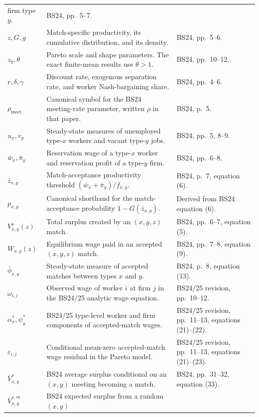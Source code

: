 \documentclass[11pt]{article}
\begin{document}
\begin{longtable}{p{}p{}p{}}
firm type \(y\). & BS24, pp.\ 5--7. \\
\(z,G,g\) & Match-specific productivity, its cumulative distribution, and
its density. & BS24, pp.\ 5--6. \\
\(z_0,\theta\) & Pareto scale and shape parameters.  The exact finite-mean
results use \(\theta>1\). & BS24, pp.\ 10--12. \\
\(r,\delta,\gamma\) & Discount rate, exogenous separation rate, and worker
Nash-bargaining share. & BS24, pp.\ 4--6. \\
\(\rho_{\mathrm{meet}}\) & Canonical symbol for the BS24 meeting-rate
parameter, written \(\rho\) in that paper. & BS24, p.\ 5. \\
\(u_x,v_y\) & Steady-state measures of unemployed type-\(x\) workers and
vacant type-\(y\) jobs. & BS24, pp.\ 5, 8--9. \\
\(\bar w_x,\bar\pi_y\) & Reservation wage of a type-\(x\) worker and
reservation profit of a type-\(y\) firm. & BS24, pp.\ 6--8. \\
\(\bar z_{x,y}\) & Match-acceptance productivity threshold
\((\bar w_x+\bar\pi_y)/f_{x,y}\). & BS24, p.\ 7, equation (6). \\
\(p_{x,y}\) & Canonical shorthand for the match-acceptance probability
\(1-G(\bar z_{x,y})\). & Derived from BS24 equation (6). \\
\(V^s_{x,y}(z)\) & Total surplus created by an \((x,y,z)\) match. & BS24,
pp.\ 6--7, equation (5). \\
\(W_{x,y}(z)\) & Equilibrium wage paid in an accepted
\((x,y,z)\) match. & BS24, pp.\ 7--8, equation (9). \\
\(\bar\phi_{x,y}\) & Steady-state measure of accepted matches between types
\(x\) and \(y\). & BS24, p.\ 8, equation (13). \\
\(\omega_{i,j}\) & Observed wage of worker \(i\) at firm \(j\) in the BS24/25
analytic wage equation. & BS24/25 revision, pp.\ 10--12. \\
\(\alpha_x^*,\psi_y^*\) & BS24/25 type-level worker and firm components of
accepted-match wages. & BS24/25 revision, pp.\ 11--13,
equations (21)--(22). \\
\(\varepsilon_{i,j}\) & Conditional mean-zero accepted-match wage residual in
the Pareto model. & BS24/25 revision, pp.\ 11--13,
equations (21)--(23). \\
\(\bar V^s_{x,y}\) & BS24 average surplus conditional on an \((x,y)\) meeting
becoming a match. & BS24, pp.\ 31--32, equation (33). \\
\(\bar V^{s,m}_{x,y}\) & BS24 expected surplus from a random \((x,y)\)

\end{longtable}
\end{document}

